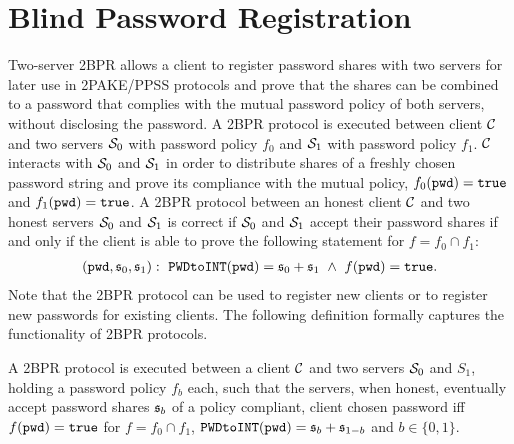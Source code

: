 \section{Blind Password Registration} \label{sec:2pake-registration}
Two-server \ac{2BPR} allows a client to register password shares with two servers for later use in \ac{2PAKE}/\ac{PPSS} protocols and prove that the shares can be combined to a password that complies with the mutual password policy of both servers, without disclosing the password.
A \ac{2BPR} protocol is executed between client $\mathcal{C}$ and two servers $\mathcal{S}_0$ with password policy $f_0$ and $\mathcal{S}_1$ with password policy $f_1$.
$\mathcal{C}$ interacts with $\mathcal{S}_0$ and $\mathcal{S}_1$ in order to distribute shares of a freshly chosen password string \pwd and prove its compliance with the mutual policy, \ie $f_0(\mathtt{pwd})=\mathtt{true}$ and $f_1(\mathtt{pwd})=\mathtt{true}$.
A \ac{2BPR} protocol between an honest client $\mathcal{C}$ and two honest servers $\mathcal{S}_0$ and $\mathcal{S}_1$ is correct if $\mathcal{S}_0$ and $\mathcal{S}_1$ accept their password shares if and only if the client is able to prove the following statement for $f=f_0\cap f_1$:
\begin{align}
  (\mathtt{pwd},\mathfrak{s}_0,\mathfrak{s}_1):~ \texttt{PWDtoINT}(\mathtt{pwd})=\mathfrak{s}_0+\mathfrak{s}_1 ~ \wedge ~ f(\mathtt{pwd})=\mathtt{true}.
  \label{eq:zkppc-pok}
\end{align}
Note that the \ac{2BPR} protocol can be used to register new clients or to register new passwords for existing clients. The following definition formally captures the functionality of \ac{2BPR} protocols.

\begin{definition}\label{def:2bpr}
A \ac{2BPR} protocol is executed between a client $\mathcal{C}$ and two servers $\mathcal{S}_0$ and $S_{1}$, holding a password policy $f_b$ each, such that the servers, when honest, eventually accept password shares $\mathfrak{s}_b$ of a policy compliant, client chosen password \pwd iff $f(\mathtt{pwd})=\mathtt{true}$ for $f=f_0\cap f_1$, $\texttt{PWDtoINT}(\mathtt{pwd})=\mathfrak{s}_b+\mathfrak{s}_{1-b}$ and $b\in\{0,1\}$.
\eod
\end{definition}

